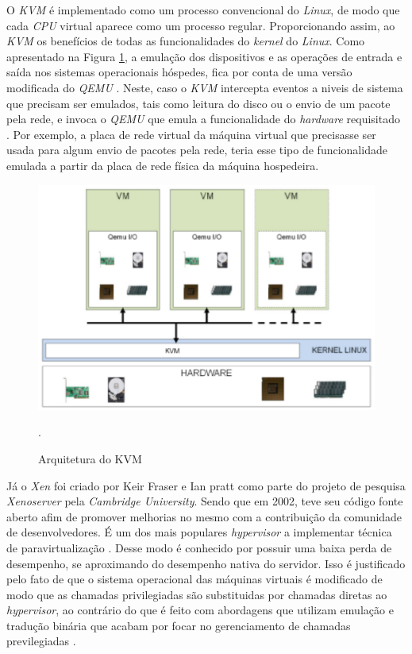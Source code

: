 O \textit{KVM} é implementado como um processo convencional do \textit{Linux}, de modo que cada \textit{CPU} virtual aparece como um processo regular. Proporcionando assim, ao \textit{KVM} os benefícios de todas as funcionalidades do \textit{kernel} do \textit{Linux}\cite{redhatkvm}. Como apresentado na Figura \ref{kvm_arc}, a emulação dos dispositivos e as operações de entrada e saída nos sistemas operacionais hóspedes, fica por conta de uma versão modificada do \textit{QEMU} \cite{redhatkvm,qumranet}. Neste, caso o \textit{KVM} intercepta eventos a niveis de sistema que precisam ser emulados, tais como leitura do disco ou o envio de um pacote pela rede, e invoca o \textit{QEMU} que emula a funcionalidade do \textit{hardware} requisitado \cite{rasmusson}. Por exemplo, a placa de rede virtual da máquina virtual que precisasse ser usada para algum envio de pacotes pela rede, teria esse tipo de funcionalidade emulada a partir da placa de rede física da máquina hospedeira. 

\begin{figure}[!htb]
\centering
\includegraphics [keepaspectratio=true,scale=0.6]{figuras/kvm_arc.eps}
\caption{Arquitetura do KVM}
\cite{fabiano}.
\label{kvm_arc}
\end{figure}

Já o \textit{Xen} foi criado por Keir Fraser e Ian pratt como parte do projeto de pesquisa \textit{Xenoserver} pela \textit{Cambridge University}. Sendo que em 2002, teve seu código fonte aberto afim de promover melhorias no mesmo com a contribuição da comunidade de desenvolvedores. É um dos mais populares \textit{hypervisor} a implementar técnica de paravirtualização \cite{xen}. Desse modo é conhecido por possuir uma baixa perda de desempenho, se aproximando do desempenho nativa do servidor\cite{walters}. Isso é justificado pelo fato de que o sistema operacional das máquinas virtuais é modificado de modo que as chamadas privilegiadas são substituidas por chamadas diretas ao \textit{hypervisor}, ao contrário do que é feito com abordagens que utilizam emulação e tradução binária que acabam por focar no gerenciamento de chamadas previlegiadas \cite{redhatkvm}. 

